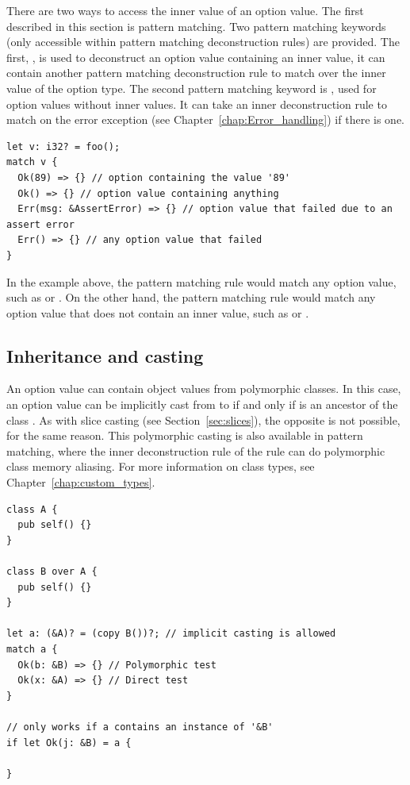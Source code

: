 There are two ways to access the inner value of an option value. The first
described in this section is pattern matching. Two pattern matching keywords
(only accessible within pattern matching deconstruction rules) are provided. The
first, , is used to deconstruct an option value containing an inner
value, it can contain another pattern matching deconstruction rule to match over
the inner value of the option type. The second pattern matching keyword is
, used for option values without inner values. It can take an inner
deconstruction rule to match on the error exception (see
Chapter~\ref{chap:Error_handling}) if there is one.

\begin{lstlisting}[style=coloredverbatimError]
let v: i32? = foo();
match v {
  Ok(89) => {} // option containing the value '89'
  Ok() => {} // option value containing anything
  Err(msg: &AssertError) => {} // option value that failed due to an assert error
  Err() => {} // any option value that failed
}
\end{lstlisting}

In the example above, the  pattern matching rule would match any
option value, such as  or . On the other hand, the
 pattern matching rule would match any option value that does not
contain an inner value, such as  or .


\subsection{Inheritance and casting}

An option value can contain object values from polymorphic classes. In this
case, an option value can be implicitly cast from  to  if
and only if  is an ancestor of the class . As with slice
casting (see Section~\ref{sec:slices}), the opposite is not possible, for the
same reason. This
polymorphic casting is also available in pattern matching, where the inner
deconstruction rule of the  rule can do polymorphic class memory
aliasing. For more information on class types, see
Chapter~\ref{chap:custom_types}.

\begin{lstlisting}[style=coloredverbatim]
class A {
  pub self() {}
}

class B over A {
  pub self() {}
}

let a: (&A)? = (copy B())?; // implicit casting is allowed
match a {
  Ok(b: &B) => {} // Polymorphic test
  Ok(x: &A) => {} // Direct test
}

// only works if a contains an instance of '&B'
if let Ok(j: &B) = a {

}
\end{lstlisting}
